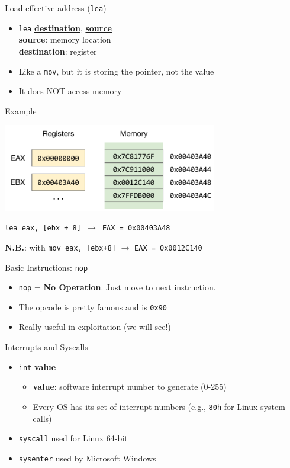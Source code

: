 \documentclass[]{beamer}
\begin{document}
\begin{frame}{Load effective address ({\tt lea})}
  \begin{itemize}
  		\item{{\tt lea} \underline{\textbf{destination}}, \underline{\textbf{source}}}\\
  		\textbf{source}: memory location\\
    	\textbf{destination}: register\\
  		\item{Like a {\tt mov}, but it is storing the pointer, not the value}
  		\item \alert{It does NOT access memory}
  \end{itemize}

  \begin{block}{Example}
  \par\noindent{}
  \centerline{\includegraphics[width=0.7\textwidth]{images/x86-lea}}
  \centerline{\tt lea eax, [ebx + 8] $\rightarrow$ \texttt{EAX = 0x00403A48}}
  \centerline{\textbf{N.B.}: with {\tt mov eax, [ebx+8]} $\rightarrow$ {\tt EAX = 0x0012C140}}
   \end{block}
\end{frame}

\begin{frame}{Basic Instructions: {\tt nop}}
  \begin{itemize}
  \item{{\tt nop} = \textbf{No Operation}. Just move to next instruction.}
  \item{The opcode is pretty famous and is {\tt 0x90}}
  \item{Really useful in exploitation (we will see!)}
  \end{itemize}
\end{frame}

\begin{frame}{Interrupts and Syscalls}

  \begin{itemize}
  	\item {\tt int} \underline{\textbf{value}}
  		\begin{itemize} 
  			\item \textbf{value}: software interrupt number to generate (0-255)
  			\item Every OS has its set of interrupt numbers (e.g., {\tt 80h} for Linux system calls)
  		\end{itemize}
  	\item {\tt syscall} used for Linux 64-bit
  	\item {\tt sysenter} used by Microsoft Windows
  \end{itemize}
\end{frame}
\end{document}

